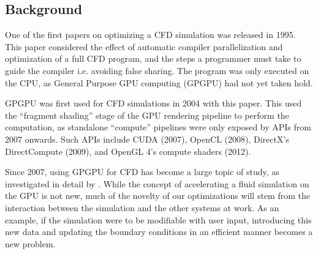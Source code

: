 \subsection{Background}
One of the first papers on optimizing a CFD simulation was released in 1995\cite{paper:1995CfdOpt:1383209}.
This paper considered the effect of automatic compiler parallelization and optimization of a full CFD program, and the steps a programmer must take to guide the compiler i.e. avoiding false sharing.
The program was only executed on the CPU, as General Purpose GPU computing (GPGPU) had not yet taken hold.

GPGPU was first used for CFD simulations in 2004 with this paper\cite{paper:2004CfdGPU:10.1109/SC.2004.26}.
This used the ``fragment shading'' stage of the GPU rendering pipeline to perform the computation, as standalone ``compute'' pipelines were only exposed by APIs from 2007 onwards.
Such APIs include CUDA (2007)\cite{tool:CUDAProgrammingV1}, OpenCL (2008)\cite{tool:OpenCL1.0PressRelease}, DirectX's DirectCompute (2009)\cite{tool:DirectComputePresentation}, and OpenGL 4's compute shaders (2012)\cite{tool:OpenGLComputeShaderExt}.

Since 2007, using GPGPU for CFD has become a large topic of study, as investigated in detail by \cite{paper:GPGPUSummary:10.1007/s11227-013-1015-7}.
While the concept of accelerating a fluid simulation on the GPU is not new, much of the novelty of our optimizations will stem from the interaction between the simulation and the other systems at work.
As an example, if the simulation were to be modifiable with user input, introducing this new data and updating the boundary conditions in an efficient manner becomes a new problem.
